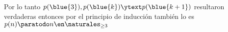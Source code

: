Por lo tanto
$p(\blue{3}), p(\blue{k}) \ytext p(\blue{k+1})$ resultaron verdaderas entonces por el principio de inducción también
lo es $p(n) \paratodo n \en \naturales_{\geq3}$

\begin{aportes}
  \item {}
\end{aportes}
